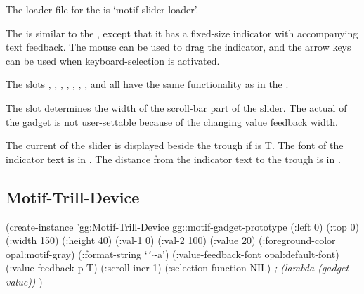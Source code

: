 \begin{center}
\end{center}

 The loader file for the  is
`motif-slider-loader'.

The  is similar to the ,
except that it has a fixed-size indicator with accompanying text
feedback.  The mouse can be used to drag the indicator, and the arrow
keys can be used when keyboard-selection is activated.

The slots , , , ,
, , ,  and
 all have the same functionality as in the
.

The  slot determines the width of the scroll-bar
part of the slider.  The actual  of the gadget is not
user-settable because of the changing value feedback width.

The current  of the slider is displayed beside the trough
if  is T.  The font of the indicator text is in
.  The distance from the indicator text to the
trough is in .


\begin{group}
\section{Motif-Trill-Device}
\label{motif-trill-device}

\begin{center}
\end{center}
		
\begin{programexample}		
(create-instance 'gg:Motif-Trill-Device gg::motif-gadget-prototype
  (:left 0) (:top 0)
  (:width 150) (:height 40)
  (:val-1 0) (:val-2 100)
  (:value 20)
  (:foreground-color opal:motif-gray)
  (:format-string `{\tt\char`\~}a')
  (:value-feedback-font opal:default-font)
  (:value-feedback-p T)
  (:scroll-incr 1)
  (:selection-function NIL)   {\it ; (lambda (gadget value))}
  )
\end{programexample}
\end{group}

